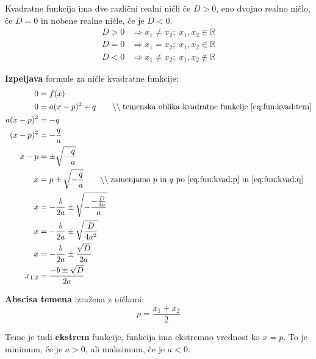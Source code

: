 \documentclass[a4paper,oneside,12pt,fleqn]{article}
\def\R{\ensuremath{\mathbb R}}
\newcommand{\comment}[1]{\ensuremath{\qquad\backslash\backslash\;}\textnormal{#1}}
\renewcommand\implies\Rightarrow
\numberwithin{equation}{section}
\begin{document}
Kvadratne funkcija ima dve različni realni ničli če $D > 0$, eno dvojno realno ničlo, če
$D = 0$ in nobene realne ničle, če je $D < 0$.
\begin{align*}
  D > 0 &\implies x_1 \neq x_2; \; x_1, x_2 \in \R \\
  D = 0 &\implies x_1 = x_2; \; x_1, x_2 \in \R \\
  D < 0 &\implies x_1 \neq x_2; \; x_1, x_2 \notin \R
\end{align*}

\textbf{Izpeljava} formule za ničle kvadratne funkcije:
\begin{align*}
  0 &= f(x) \\
  0 &= a(x-p)^2 + q \comment{temenska oblika kvadratne funkcije \eqref{eq:fun:kvad:tem}} \\
  a(x-p)^2 &= -q \\
  (x-p)^2 &= -\frac{q}{a} \\
  x-p &= \pm \sqrt{-\frac{q}{a}} \\
  x &= p \pm \sqrt{-\frac{q}{a}} \comment{zamenjamo $p$ in $q$ po 
  \eqref{eq:fun:kvad:p} in \eqref{eq:fun:kvad:q}} \\
  x &= - \frac{b}{2a} \pm \sqrt{-\frac{-\frac{D}{4a}}{a}} \\
  x &= - \frac{b}{2a} \pm \sqrt{\frac{D}{4a^2}} \\
  x &= - \frac{b}{2a} \pm \frac{\sqrt{D}}{2a} \\
  x_{1,2} &= \frac{-b \pm \sqrt{D}}{2a}
\end{align*}

\textbf{Abscisa temena} izražena z ničlami:
\[ p = \frac{x_1+x_2}{2} \]

Teme je tudi \textbf{ekstrem} funkcije, funkcija ima ekstremno vrednost ko $x = p$. To je
minimum, če je $a > 0$, ali maksimum, če je $a < 0$.
\end{document}
